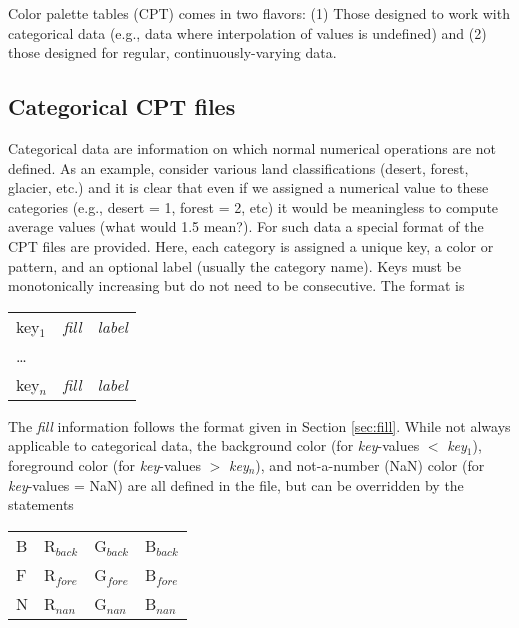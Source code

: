 Color palette tables (CPT) comes in two flavors: (1) Those designed to work with
categorical data (e.g., data where interpolation of values is undefined) and
(2) those designed for regular, continuously-varying data.

\subsection{Categorical CPT files}

Categorical data are information on which normal numerical operations are not
defined. As an example, consider various land classifications (desert, forest, glacier, etc.)
and it is clear that even if we assigned a numerical value to these categories (e.g.,
desert = 1, forest = 2, etc) it would be meaningless to compute average values (what would
1.5 mean?).  For such data a special format of the CPT files are provided.  Here,
each category is assigned a unique key, a color or pattern, and an optional
label (usually the category name).  Keys must be monotonically increasing but do not
need to be consecutive.  The format is

\begin{center}
\begin{tabular}{lll}
key$_1$ &  {\it fill} &  \emph{label} \\ 
\ldots & & \\ 
key$_n$ &  {\it fill} &  \emph{label} \\ 
\end{tabular} 
\end{center}

The {\it fill} information follows the format given in Section \ref{sec:fill}.
While not always applicable to categorical data, the background color (for
\emph{key}-values $<$ \emph{key$_1$}), foreground color
(for \emph{key}-values $>$ \emph{key$_{n}$}), and not-a-number (NaN) color (for
\emph{key}-values = NaN) are all defined in the 
file, but can be overridden by the statements

\begin{center}
\begin{tabular}{llll}
B &  R$_{back}$ &  G$_{back}$ &  B$_{back}$ \\ 
F &  R$_{fore}$ &  G$_{fore}$ &  B$_{fore}$ \\ 
N &  R$_{nan}$ &  G$_{nan}$ &  B$_{nan}$ \\
\end{tabular}
\end{center}

